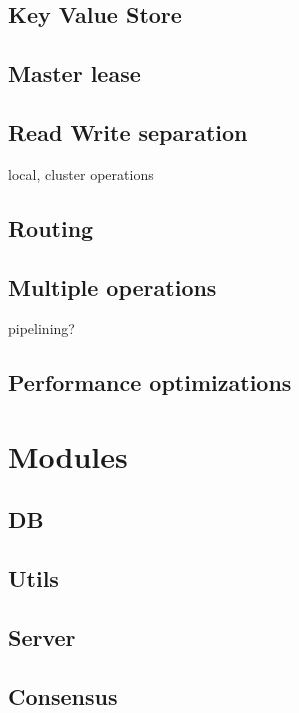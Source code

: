 \subsection{Key Value Store}

\subsection{Master lease}

\subsection{Read Write separation}

local, cluster operations

\subsection{Routing}

\subsection{Multiple operations}

pipelining?

\subsection{Performance optimizations}

\section{Modules}

\subsection{DB}

\subsection{Utils}

\subsection{Server}

\subsection{Consensus}

